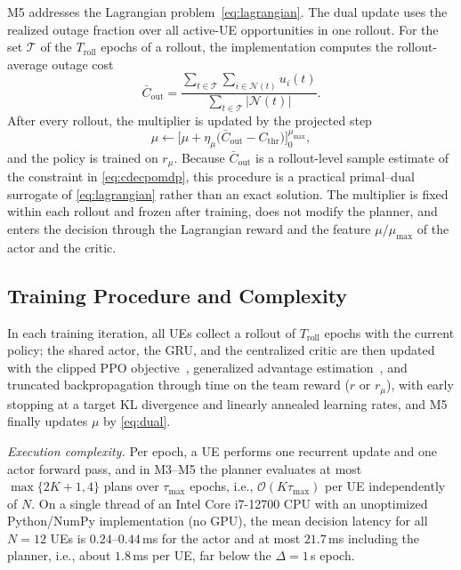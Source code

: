 \documentclass[journal]{IEEEtran}
\newcommand{\Nset}{\mathcal{N}}
\begin{document}
M5 addresses the Lagrangian problem~\eqref{eq:lagrangian}. The dual update
uses the realized outage fraction over all active-UE opportunities in one
rollout. For the set $\mathcal{T}$ of the $T_{\mathrm{roll}}$ epochs of a
rollout, the implementation computes the rollout-average outage cost
\begin{equation}
\bar C_{\mathrm{out}}=
\frac{\sum_{t\in\mathcal{T}}\sum_{i\in\Nset(t)}u_i(t)}{\sum_{t\in\mathcal{T}}|\Nset(t)|}.
\end{equation}
After every rollout, the multiplier is updated by the projected step
\begin{equation}
\mu\leftarrow\Big[\mu+\eta_\mu\big(\bar C_{\mathrm{out}}-C_{\mathrm{thr}}\big)\Big]_0^{\mu_{\max}},
\label{eq:dual}
\end{equation}
and the policy is trained on $r_\mu$. Because $\bar C_{\mathrm{out}}$ is a
rollout-level sample estimate of the constraint in \eqref{eq:cdecpomdp}, this
procedure is a practical primal--dual surrogate of \eqref{eq:lagrangian}
rather than an exact solution. The multiplier is fixed within each rollout and frozen after training, does not modify the planner, and enters the
decision through the Lagrangian reward and the feature $\mu/\mu_{\max}$ of the
actor and the critic.

\subsection{Training Procedure and Complexity}

In each training iteration, all UEs collect a rollout of $T_{\mathrm{roll}}$
epochs with the current policy; the shared actor, the GRU, and the centralized
critic are then updated with the clipped PPO objective~\cite{schulman2017ppo},
generalized advantage estimation~\cite{schulman2016gae}, and truncated
backpropagation through time on the team reward ($r$ or $r_\mu$), with early
stopping at a target KL divergence and linearly annealed learning rates, and
M5 finally updates $\mu$ by \eqref{eq:dual}.

\emph{Execution complexity.} Per epoch, a UE performs one recurrent update
and one actor forward pass, and in M3--M5 the planner evaluates at most
$\max\{2K+1,4\}$ plans over $\tau_{\max}$ epochs, i.e., $\mathcal{O}(K\tau_{\max})$
per UE independently of $N$. On a single thread of an Intel Core i7-12700 CPU
with an unoptimized Python/NumPy implementation (no GPU), the mean decision
latency for all $N=12$ UEs is $0.24$--$0.44$\,ms for the actor and at most
$21.7$\,ms including the planner, i.e., about $1.8$\,ms per UE, far below the
$\Delta=1$\,s epoch.
\end{document}
